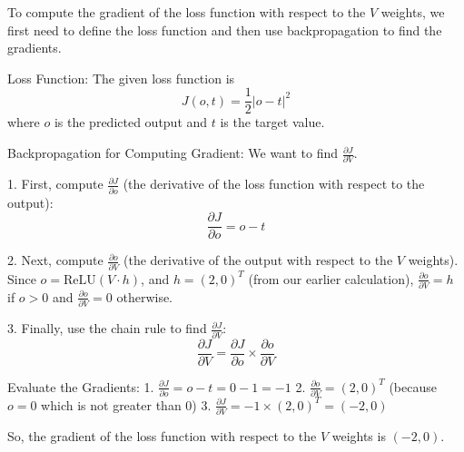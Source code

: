To compute the gradient of the loss function with respect to the \( V \) weights, we first need to define the loss function and then use backpropagation to find the gradients.

Loss Function:
The given loss function is 
\[
J(o, t) = \frac{1}{2} |o - t|^2
\]
where \( o \) is the predicted output and \( t \) is the target value.

Backpropagation for Computing Gradient:
We want to find \( \frac{\partial J}{\partial V} \).

1. First, compute \( \frac{\partial J}{\partial o} \) (the derivative of the loss function with respect to the output):
\[
\frac{\partial J}{\partial o} = o - t
\]

2. Next, compute \( \frac{\partial o}{\partial V} \) (the derivative of the output with respect to the \( V \) weights). Since \( o = \text{ReLU}(V \cdot h) \), and \( h = (2, 0)^T \) (from our earlier calculation), \( \frac{\partial o}{\partial V} = h \) if \( o > 0 \) and \( \frac{\partial o}{\partial V} = 0 \) otherwise.

3. Finally, use the chain rule to find \( \frac{\partial J}{\partial V} \):
\[
\frac{\partial J}{\partial V} = \frac{\partial J}{\partial o} \times \frac{\partial o}{\partial V}
\]

Evaluate the Gradients:
1. \( \frac{\partial J}{\partial o} = o - t = 0 - 1 = -1 \)
2. \( \frac{\partial o}{\partial V} = (2, 0)^T \) (because \( o = 0 \) which is not greater than 0)
3. \( \frac{\partial J}{\partial V} = -1 \times (2, 0)^T = (-2, 0) \)

So, the gradient of the loss function with respect to the \( V \) weights is \( (-2, 0) \).
